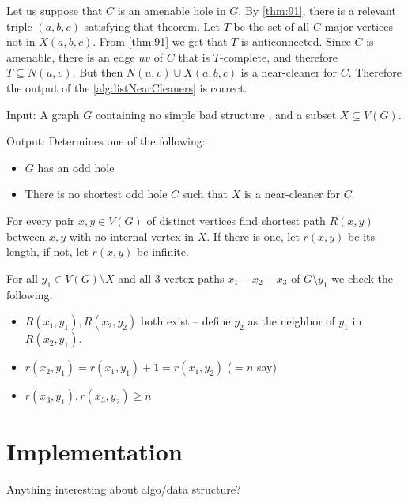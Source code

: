 \documentclass{report}
\begin{document}
Let us suppose that $C$ is an amenable hole in $G$. By \cref{thm:91}, there is a relevant triple $(a, b, c)$ satisfying that theorem. Let $T$ be the set of all $C$-major vertices not in $X(a,b,c)$. From \cref{thm:91} we get that $T$ is anticonnected. Since $C$ is amenable, there is an edge $uv$ of $C$ that is $T$-complete, and therefore $T \subseteq N(u, v)$. But then $N(u, v) \cup X(a, b, c)$ is a near-cleaner for $C$. Therefore the output of the \cref{alg:listNearCleaners} is correct.

\begin{alg}
	Input: A graph $G$ containing no simple bad structure , and a subset $X \subseteq V(G)$.

	\noindent Output: Determines one of the following:
	\begin{itemize}
		\item $G$ has an odd hole
		\item There is no shortest odd hole $C$ such that $X$ is a near-cleaner for $C$.
	\end{itemize}
\end{alg}
\begin{algtext}
	For every pair $x, y \in V(G)$ of distinct vertices find shortest path $R(x, y)$ between $x, y$ with no internal vertex in $X$. If there is one, let $r(x, y)$ be its length, if not, let $r(x, y)$ be infinite.

	For all $y_1 \in V(G)\setminus X$ and all 3-vertex paths $x_1-x_2-x_3$ of $G\setminus y_1$ we check the following:
	\begin{itemize}
		\item $R(x_1, y_1), R(x_2, y_2)$ both exist -- define $y_2$ as the neighbor of $y_1$ in $R(x_2, y_1)$.
		\item $r(x_2, y_1) = r(x_1, y_1) + 1 = r(x_1, y_2)$ ($=n$ say)
		\item $r(x_3, y_1), r(x_3, y_2) \geq n$
	\end{itemize}
\end{algtext}



\section{Implementation}

Anything interesting about algo/data structure?\\
\end{document}
